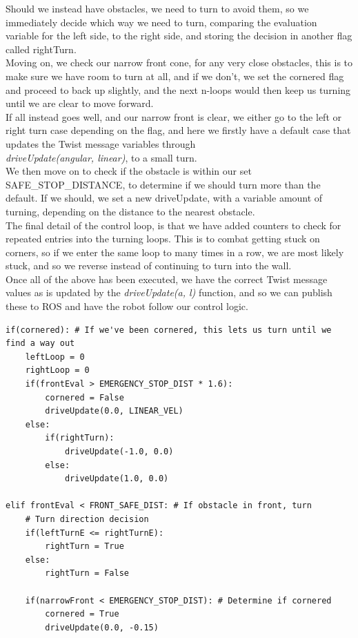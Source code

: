\documentclass[conference]{IEEEtran}
\begin{document}
\begin{itemize}
Should we instead have obstacles, we need to turn to avoid them, so we immediately decide which way we need to turn, comparing
the evaluation variable for the left side, to the right side, and storing the decision in another flag called rightTurn.\\
Moving on, we check our narrow front cone, for any very close obstacles, this is to make sure we have room to turn at all, and if
we don't, we set the cornered flag and proceed to back up slightly, and the next n-loops would then keep us turning until we are
clear to move forward. \\
If all instead goes well, and our narrow front is clear, we either go to the left or right turn case depending on the flag, 
and here we firstly have a default case that updates the Twist message variables through \\\textit{driveUpdate(angular, linear)},
to a small turn. \\
We then move on to check if the obstacle is within our set SAFE\_STOP\_DISTANCE, to determine if we should turn more than the
default. If we should, we set a new driveUpdate, with a variable amount of turning, depending on the distance to the nearest obstacle.\\
The final detail of the control loop, is that we have added counters to check for repeated entries into the turning loops. This is
to combat getting stuck on corners, so if we enter the same loop to many times in a row, we are most likely stuck, and so we 
reverse instead of continuing to turn into the wall.\\
Once all of the above has been executed, we have the correct Twist message values as is updated by the \textit{driveUpdate(a, l)}
function, and so we can publish these to ROS and have the robot follow our control logic.
\begin{lstlisting}
if(cornered): # If we've been cornered, this lets us turn until we find a way out
    leftLoop = 0
    rightLoop = 0
    if(frontEval > EMERGENCY_STOP_DIST * 1.6):
        cornered = False
        driveUpdate(0.0, LINEAR_VEL)
    else:
        if(rightTurn):
            driveUpdate(-1.0, 0.0)
        else:
            driveUpdate(1.0, 0.0)

elif frontEval < FRONT_SAFE_DIST: # If obstacle in front, turn
    # Turn direction decision
    if(leftTurnE <= rightTurnE):
        rightTurn = True
    else:
        rightTurn = False

    if(narrowFront < EMERGENCY_STOP_DIST): # Determine if cornered
        cornered = True
        driveUpdate(0.0, -0.15)


\end{lstlisting}
\end{itemize}
\end{document}
